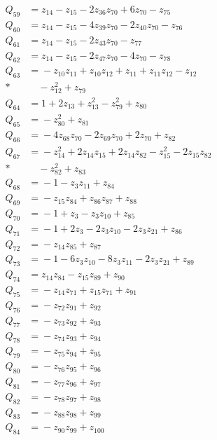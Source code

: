 \begin{align*}
Q_{59} &={}z_{14} - z_{15} - 2z_{36}z_{70} + 6z_{70} - z_{75}\\[4pt]
Q_{60} &={}z_{14} - z_{15} - 4z_{39}z_{70} - 2z_{40}z_{70} - z_{76}\\[4pt]
Q_{61} &={}z_{14} - z_{15} - 2z_{43}z_{70} - z_{77}\\[4pt]
Q_{62} &={}z_{14} - z_{15} - 2z_{47}z_{70} - 4z_{70} - z_{78}\\[4pt]
Q_{63} &={}-z_{10}z_{11} + z_{10}z_{12} + z_{11} + z_{11}z_{12} - z_{12}\\*
&\quad{} - z_{12}^{2} + z_{79}\\[4pt]
Q_{64} &={}1 + 2z_{13} + z_{13}^{2} - z_{79}^{2} + z_{80}\\[4pt]
Q_{65} &={}-z_{80}^{2} + z_{81}\\[4pt]
Q_{66} &={}-4z_{68}z_{70} - 2z_{69}z_{70} + 2z_{70} + z_{82}\\[4pt]
Q_{67} &={}-z_{14}^{2} + 2z_{14}z_{15} + 2z_{14}z_{82} - z_{15}^{2} - 2z_{15}z_{82}\\*
&\quad{} - z_{82}^{2} + z_{83}\\[4pt]
Q_{68} &={}-1 - z_{3}z_{11} + z_{84}\\[4pt]
Q_{69} &={}-z_{15}z_{84} + z_{86}z_{87} + z_{88}\\[4pt]
Q_{70} &={}-1 + z_{3} - z_{3}z_{10} + z_{85}\\[4pt]
Q_{71} &={}-1 + 2z_{3} - 2z_{3}z_{10} - 2z_{3}z_{21} + z_{86}\\[4pt]
Q_{72} &={}-z_{14}z_{85} + z_{87}\\[4pt]
Q_{73} &={}-1 - 6z_{3}z_{10} - 8z_{3}z_{11} - 2z_{3}z_{21} + z_{89}\\[4pt]
Q_{74} &={}z_{14}z_{84} - z_{15}z_{89} + z_{90}\\[4pt]
Q_{75} &={}-z_{14}z_{71} + z_{15}z_{71} + z_{91}\\[4pt]
Q_{76} &={}-z_{72}z_{91} + z_{92}\\[4pt]
Q_{77} &={}-z_{73}z_{92} + z_{93}\\[4pt]
Q_{78} &={}-z_{74}z_{93} + z_{94}\\[4pt]
Q_{79} &={}-z_{75}z_{94} + z_{95}\\[4pt]
Q_{80} &={}-z_{76}z_{95} + z_{96}\\[4pt]
Q_{81} &={}-z_{77}z_{96} + z_{97}\\[4pt]
Q_{82} &={}-z_{78}z_{97} + z_{98}\\[4pt]
Q_{83} &={}-z_{88}z_{98} + z_{99}\\[4pt]
Q_{84} &={}-z_{90}z_{99} + z_{100}\\[4pt]

\end{align*}
